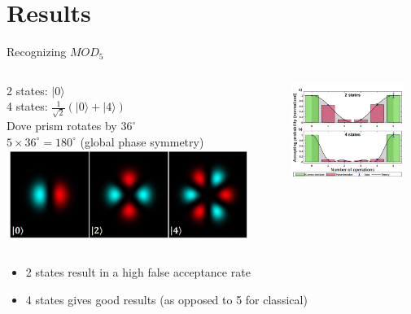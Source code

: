 \documentclass[aspectratio=169,9pt]{beamer}
\begin{document}
\section{Results}
\begin{frame}[t]{Recognizing $MOD_5$}
  \begin{columns}
    \begin{column}{0.5\textwidth}
      2 states: $|0\rangle$\\
      4 states: $\frac{1}{\sqrt{2}}(|0\rangle + |4\rangle)$\\
      Dove prism rotates by $36^{\circ}$ \\
      $5 \times 36^{\circ} = 180^{\circ}$ (global phase symmetry)
      \includegraphics[width=0.9\textwidth]{multi_qbit_photon_states.png}
    \end{column}
    \begin{column}{0.5\textwidth}
      \includegraphics[width=0.9\textwidth]{2states_4states.png}
    \end{column}
  \end{columns}
  \begin{itemize}
    \item 2 states result in a high false acceptance rate
    \item 4 states gives good results (as opposed to 5 for classical)
  \end{itemize}
\end{frame}
\end{document}
